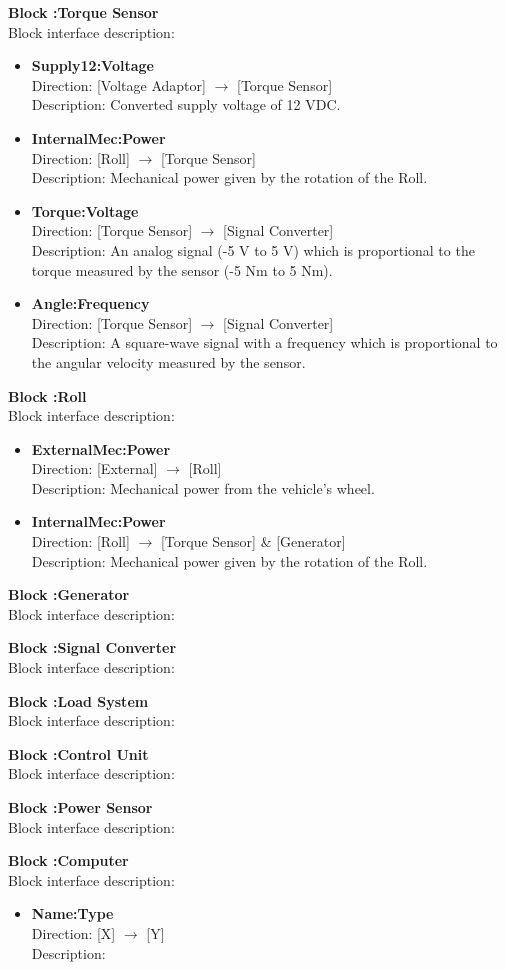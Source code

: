 \textbf{Block :Torque Sensor}\\
Block interface description:
\begin{itemize}
	\item \textbf{Supply12:Voltage}\\
	Direction: [Voltage Adaptor] $\rightarrow$ [Torque Sensor]\\
	Description: Converted supply voltage of 12 VDC.
	\item \textbf{InternalMec:Power}\\
	Direction: [Roll] $\rightarrow$ [Torque Sensor]\\
	Description: Mechanical power given by the rotation of the Roll.
	\item \textbf{Torque:Voltage}\\
	Direction: [Torque Sensor] $\rightarrow$ [Signal Converter]\\
	Description: An analog signal (-5 V to 5 V) which is proportional to the torque measured by the sensor (-5 Nm to 5 Nm).
	\item \textbf{Angle:Frequency}\\
	Direction: [Torque Sensor] $\rightarrow$ [Signal Converter]\\
	Description: A square-wave signal with a frequency which is proportional to the angular velocity measured by the sensor.
\end{itemize}


\textbf{Block :Roll}\\
Block interface description:
\begin{itemize}
	\item \textbf{ExternalMec:Power}\\
	Direction: [External] $\rightarrow$ [Roll]\\
	Description: Mechanical power from the vehicle's wheel.
	\item \textbf{InternalMec:Power}\\
	Direction: [Roll] $\rightarrow$ [Torque Sensor] \& [Generator]\\
	Description: Mechanical power given by the rotation of the Roll.
\end{itemize}

\textbf{Block :Generator}\\
Block interface description:


\textbf{Block :Signal Converter}\\
Block interface description:

\textbf{Block :Load System}\\
Block interface description:

\textbf{Block :Control Unit}\\
Block interface description:

\textbf{Block :Power Sensor}\\
Block interface description:

\textbf{Block :Computer}\\
Block interface description:
\begin{itemize}
	\item \textbf{Name:Type}\\
	Direction: [X] $\rightarrow$ [Y]\\
	Description:
\end{itemize}